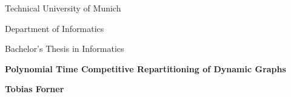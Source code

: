 \documentclass[xcolor=dvipsnames, tikz, 12pt]{article}
\theoremstyle{definition}
\begin{document}
	\begin{titlepage}
		\begin{center}
			\vspace*{1cm}
			
			\large
			Technical University of Munich\\
			\vspace*{1cm}
			
			Department of Informatics\\
			\vspace*{1cm}
			
			Bachelor's Thesis in Informatics\\
			\vspace*{1cm}
			
			\Huge
			\textbf{Polynomial Time Competitive Repartitioning of Dynamic Graphs}\\
			
			
			\vspace{2cm}
			
			\Large
			\textbf{Tobias Forner}
			
			\vfill
			
		\end{center}
	\end{titlepage}
\end{document}
